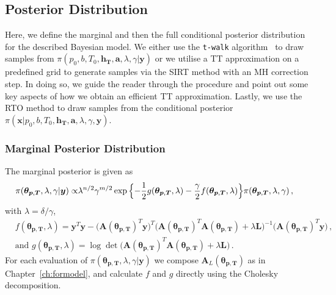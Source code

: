\subsection{Posterior Distribution}
Here, we define the marginal and then the full conditional posterior distribution for the described Bayesian model.
We either use the \texttt{t-walk} algorithm~\cite{christen2010general} to draw samples from $\pi(p_0,b,T_0,\bm{h_T},\bm{a} ,\lambda, \gamma| \bm{y})$ or we utilise a TT approximation on a predefined grid to generate samples via the SIRT method with an MH correction step.
In doing so, we guide the reader through the procedure and point out some key aspects of how we obtain an efficient TT approximation.
Lastly, we use the RTO method to draw samples from the conditional posterior $\pi(\bm{x}|p_0,b,T_0,\bm{h_T},\bm{a} ,\lambda, \gamma, \bm{y})$.

\subsubsection{Marginal Posterior Distribution}
The marginal posterior is given as
\begin{align}
	\pi( \bm{\theta}_{\bm{p}, \bm{T}},\lambda,\gamma  | \bm{y}) \propto &  \lambda^{n/2} \gamma^{m/2}   \exp{ \Bigl\{ - \frac{1}{2} g ( \bm{\theta}_{\bm{p}, \bm{T}},\lambda) - \frac{\gamma}{2} f (\bm{\theta}_{\bm{p}, \bm{T}},\lambda) \Bigr\}} \pi(\bm{\theta}_{\bm{p}, \bm{T}},\lambda,\gamma ) \, ,
	\label{eq:MargPostFull}
\end{align}
with $\lambda= \delta / \gamma$,
\begin{subequations}
	\label{eq:fandg}
	\begin{align}
		&f ( \bm{\theta}_{\bm{p}, \bm{T}},\lambda) = \bm{y}^T \bm{y} - \big(\bm{A}(\bm{\theta}_{\bm{p}, \bm{T}})^T \bm{y}\big)^T \big(\bm{A}(\bm{\theta}_{\bm{p}, \bm{T}})^T  \bm{A}(\bm{\theta}_{\bm{p}, \bm{T}}) + \lambda \bm{L}\big)^{-1} \big(\bm{A}(\bm{\theta}_{\bm{p}, \bm{T}})^T \bm{y}\big)  \label{eq:fFullAppl} \, ,  \\
		&\text{and } g(\bm{\theta}_{\bm{p}, \bm{T}},\lambda) = \log \det \big(\bm{A}(\bm{\theta}_{\bm{p}, \bm{T}})^T  \bm{A}(\bm{\theta}_{\bm{p}, \bm{T}}) + \lambda \bm{L}\big) \label{eq:gFullAppl} \, .
	\end{align}
\end{subequations}
For each evaluation of $\pi( \bm{\theta}_{\bm{p}, \bm{T}},\lambda,\gamma  | \bm{y})$ we compose $\bm{A}_L(\bm{\theta}_{\bm{p}, \bm{T}})$ as in Chapter~\ref{ch:formodel}, and calculate $f$ and $g$ directly using the Cholesky decomposition.


